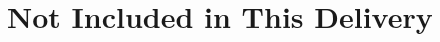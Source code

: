 \documentclass[11pt,a4paper]{article}
\begin{document}
% 

\section{Not Included in This Delivery}\label{sec:excluded}


% 

% 
% 
\end{document}

